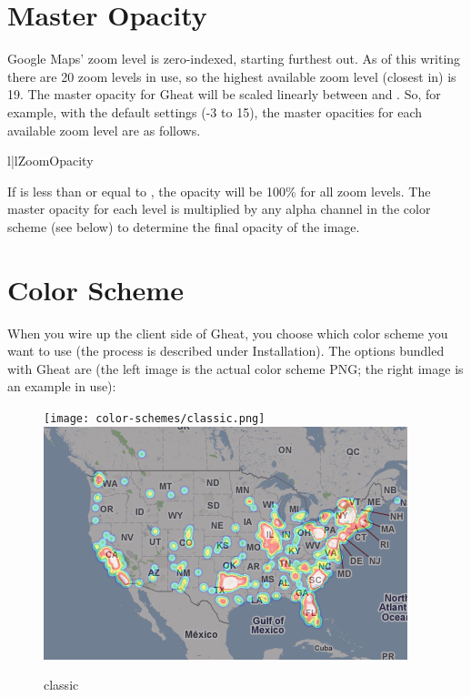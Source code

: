 \documentclass{manual}
\begin{document}
\section{Master Opacity}

Google Maps' zoom level is zero-indexed, starting furthest out. As of this
writing there are 20 zoom levels in use, so the highest available zoom level
(closest in) is 19. The master opacity for Gheat will be scaled linearly between
 and . So, for example, with the default
settings (-3 to 15), the master opacities for each available zoom level are as 
follows.

\begin{tableii}{l|l}{}{Zoom}{Opacity}
\end{tableii}


If  is less than or equal to , the
opacity will be 100\% for all zoom levels. The master opacity for each level is
multiplied by any alpha channel in the color scheme (see below) to determine the
final opacity of the image.


\section{Color Scheme}

When you wire up the client side of Gheat, you choose which color scheme you
want to use (the process is described under Installation). The options
bundled with Gheat are (the left image is the actual color scheme PNG; the right
image is an example in use):

\begin{figure}[htp]
\texttt{[image: color-schemes/classic.png]}
\includegraphics[bb=0 0 400 256]{img/cs-classic.png}
\caption{classic}\label{fig:classic}
\end{figure}
\end{document}
